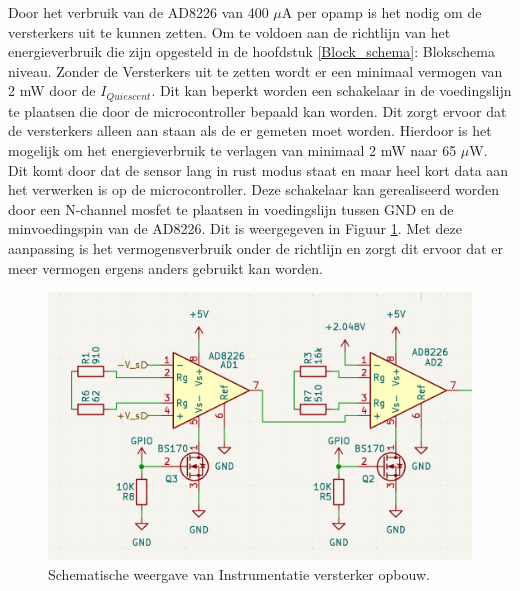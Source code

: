 Door het verbruik van de AD8226 van 400 $\mu$A per opamp is het nodig om de versterkers uit te kunnen zetten. Om te voldoen aan de richtlijn van het energieverbruik die zijn opgesteld in de hoofdstuk \ref{Block_schema}: Blokschema niveau. Zonder de Versterkers uit te zetten wordt er een minimaal vermogen van 2 mW door de $I_{Quiescent}$. Dit kan beperkt worden een schakelaar in de voedingslijn te plaatsen die door de microcontroller bepaald kan worden. Dit zorgt ervoor dat de versterkers alleen aan staan als de er gemeten moet worden. Hierdoor is het mogelijk om het energieverbruik te verlagen van minimaal 2 mW naar 65 $\mu$W. Dit komt door dat de sensor lang in rust modus staat en maar heel kort data aan het verwerken is op de microcontroller. Deze schakelaar kan gerealiseerd worden door een N-channel mosfet te plaatsen in voedingslijn tussen GND en de minvoedingspin van de AD8226. Dit is weergegeven in Figuur \ref{fig:Instrumentatie_amp_schematic}.
Met deze aanpassing is het vermogensverbruik onder de richtlijn en zorgt dit ervoor dat er meer vermogen ergens anders gebruikt kan worden. 
\begin{figure}[H]
    \centering
    \includegraphics[width=0.7\linewidth]{pictures/Intrumentatie_amplifier_schematic.png}
    \caption{Schematische weergave van Instrumentatie versterker opbouw.}
    \label{fig:Instrumentatie_amp_schematic}
\end{figure}

